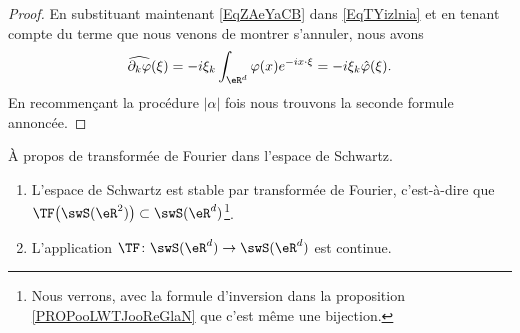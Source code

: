 \begin{proof}
	En substituant maintenant \eqref{EqZAeYaCB} dans \eqref{EqTYizlnia} et en tenant compte du terme que nous venons de montrer s'annuler, nous avons
	\begin{equation}
		\widehat{\partial_k\varphi}(\xi)=-i\xi_k\int_{\eR^d}\varphi(x) e^{-ix\cdot \xi}=-i\xi_k\hat\varphi(\xi).
	\end{equation}
	En recommençant la procédure \( | \alpha |\) fois nous trouvons la seconde formule annoncée.
\end{proof}

\begin{proposition} \label{PropKPsjyzT}
	À propos de transformée de Fourier dans l'espace de Schwartz.
	\begin{enumerate}
		\item
		      L'espace de Schwartz est stable par transformée de Fourier, c'est-à-dire que \( \TF\big( \swS(\eR^2) \big)\subset \swS(\eR^d)\)\footnote{Nous verrons, avec la formule d'inversion dans la proposition \ref{PROPooLWTJooReGlaN} que c'est même une bijection.}.
		\item
		      L'application \( \TF\colon \swS(\eR^d)\to \swS(\eR^d)\) est continue.
	\end{enumerate}
\end{proposition}

